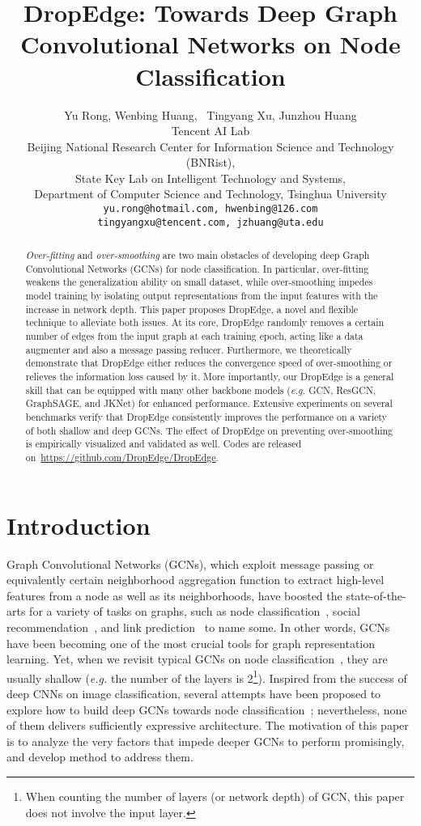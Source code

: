 \documentclass{article}
\title{DropEdge: Towards Deep Graph Convolutional Networks on Node Classification}
\author{
  Yu Rong, Wenbing Huang, ~Tingyang Xu, Junzhou Huang \\
  Tencent AI Lab \\
  Beijing National Research Center for Information Science and Technology (BNRist),\\
 State Key Lab on Intelligent Technology and Systems,\\
 Department of Computer Science and Technology, Tsinghua University\\
 \texttt{yu.rong@hotmail.com, hwenbing@126.com}\\
 \texttt{tingyangxu@tencent.com, jzhuang@uta.edu} \\
 }
\begin{document}
\maketitle

\begin{abstract}
\emph{Over-fitting} and \emph{over-smoothing} are two main obstacles of developing deep Graph Convolutional Networks (GCNs) for node classification. In particular, over-fitting weakens the generalization ability on small dataset, while over-smoothing impedes model training by isolating output representations from the input features with the increase in network depth. This paper proposes DropEdge, a novel and flexible technique to alleviate both issues. At its core, DropEdge randomly removes a certain number of edges from the input graph at each training epoch, acting like a data augmenter and also a message passing reducer. Furthermore, we theoretically demonstrate that DropEdge either reduces the convergence speed of over-smoothing or relieves the information loss caused by it. More importantly, our DropEdge is a general skill that can be equipped with many other backbone models (\emph{e.g.} GCN, ResGCN, GraphSAGE, and JKNet) for enhanced performance. Extensive experiments on several benchmarks verify that DropEdge consistently improves the performance on a variety of both shallow and deep GCNs. The effect of DropEdge on preventing over-smoothing is empirically visualized and validated as well. Codes are released on~\url{https://github.com/DropEdge/DropEdge}.




\end{abstract}

\section{Introduction}

Graph Convolutional Networks (GCNs), which exploit message passing or equivalently certain neighborhood aggregation function to extract high-level features from a node as well as its neighborhoods, have boosted the state-of-the-arts for a variety of tasks on graphs, such as node classification~\citep{Bhagat2011,Zhang2018}, social recommendation~\citep{Freeman2000,perozzi2014deepwalk}, and link prediction~\citep{Liben-Nowell2007} to name some. In other words, GCNs have been becoming one of the most crucial tools for graph representation learning.
Yet, when we revisit typical GCNs on node classification~\citep{Kipf2017}, they are usually shallow (\emph{e.g.} the number of the layers is 2\footnote{When counting the number of layers (or network depth) of GCN, this paper does not involve the input layer.}). Inspired from the success of deep CNNs on image classification, several attempts have been proposed to explore how to build deep GCNs towards node classification~\citep{Kipf2017,Li2018,Xu2018, li2019can}; nevertheless, none of them delivers sufficiently expressive architecture. The motivation of this paper is to analyze the very factors that impede deeper GCNs to perform promisingly, and develop method to address them.
\end{document}
